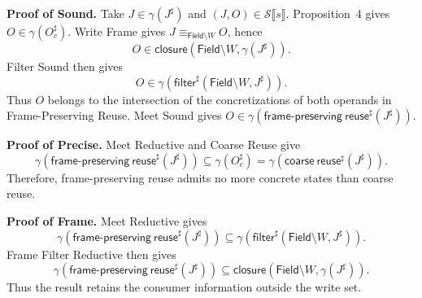 \documentclass[10pt]{article}
\newcommand{\Field}{\mathsf{Field}}
\newcommand{\Semantics}[1]{\mathcal S\mathopen{⟦}#1\mathclose{⟧}}
\newcommand{\ProjClose}{\mathsf{closure}}
\newcommand{\filter}{\mathsf{filter}}
\newcommand{\reuse}{\mathsf{coarse\ reuse}}
\newcommand{\frameReuse}{\mathsf{frame\text{-}preserving\ reuse}}
\newcommand{\agree}[1]{\mathrel{\equiv_{#1}}}
\newcommand{\qedbox}{\hfill\raisebox{0.15ex}{\fboxsep=0pt\fbox{\rule{0pt}{0.55em}\rule{0.55em}{0pt}}}}
\begin{document}
\textbf{Proof of Sound.}
Take \(J\in\gamma(J^\sharp)\) and \((J,O)\in\Semantics{s}\). Proposition~4 gives
\(O\in\gamma(O_c^\sharp)\). Write Frame gives
\(J\agree{\Field\setminus W}O\), hence
\[
  O\in\ProjClose\!\left(\Field\setminus W,\gamma(J^\sharp)\right).
\]
Filter Sound then gives
\[
  O\in\gamma\!\left(\filter^\sharp(\Field\setminus W,J^\sharp)\right).
\]
Thus \(O\) belongs to the intersection of the concretizations of both operands in
Frame-Preserving Reuse. Meet Sound gives
\(O\in\gamma(\frameReuse^\sharp(J^\sharp))\). \qedbox

\textbf{Proof of Precise.}
Meet Reductive and Coarse Reuse give
\[
  \gamma\!\left(\frameReuse^\sharp(J^\sharp)\right)
  \subseteq\gamma(O_c^\sharp)
  =\gamma\!\left(\reuse^\sharp(J^\sharp)\right).
\]
Therefore, frame-preserving reuse admits no more concrete states than coarse reuse. \qedbox

\textbf{Proof of Frame.}
Meet Reductive gives
\[
  \gamma\!\left(\frameReuse^\sharp(J^\sharp)\right)
  \subseteq
  \gamma\!\left(\filter^\sharp(\Field\setminus W,J^\sharp)\right).
\]
Frame Filter Reductive then gives
\[
  \gamma\!\left(\frameReuse^\sharp(J^\sharp)\right)
  \subseteq
  \ProjClose\!\left(\Field\setminus W,\gamma(J^\sharp)\right).
\]
Thus the result retains the consumer information outside the write set. \qedbox
\end{document}
